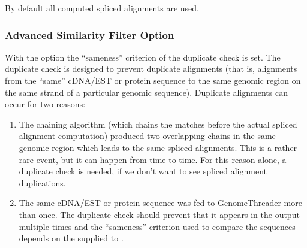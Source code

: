 \documentclass[11pt,a4paper,titlepage]{article}
\begin{document}

\begin{Justshowoptions}
\end{Justshowoptions}

By default all computed spliced alignments are used.


\subsubsection{Advanced Similarity Filter Option}
\begin{Justshowoptions}
\end{Justshowoptions}

With the option  the ``sameness'' criterion of the
duplicate check is set. The duplicate check is designed to prevent duplicate
alignments (that is, alignments from the ``same'' cDNA/EST or protein sequence to the same genomic region on the same strand of a particular genomic sequence). Duplicate alignments can occur for two reasons:

\begin{enumerate}

\item The chaining algorithm (which chains the matches before the actual
spliced alignment computation) produced two overlapping chains in the
same genomic region which leads to the same spliced alignments. This is
a rather rare event, but it can happen from time to time.
For this reason alone, a duplicate check is needed, if we don't want to see
spliced alignment duplications.

\item The same cDNA/EST or protein sequence was fed to GenomeThreader more than
once. The duplicate check should prevent that it appears in the output multiple
times and the ``sameness'' criterion used to compare the sequences depends on the \Showoptionarg{\duplicatecheckmode} supplied to .
\end{enumerate}
\end{document}
